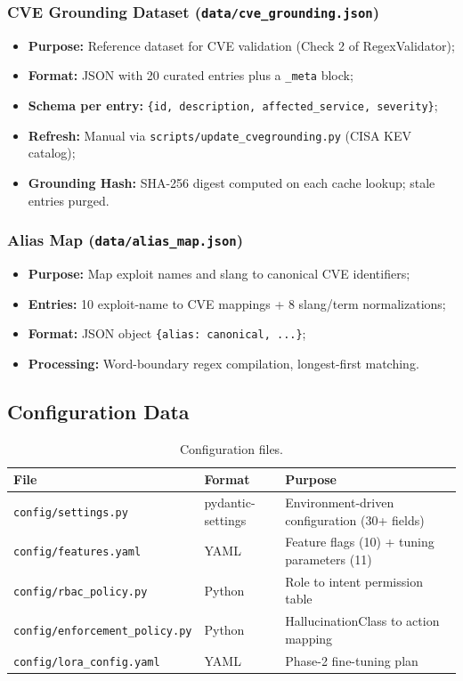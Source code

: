 ﻿\documentclass[10pt,journal,onecolumn]{IEEEtran}
\begin{document}
\subsubsection{CVE Grounding Dataset (\texttt{data/cve\_grounding.json})}
\begin{itemize}
\item \textbf{Purpose:} Reference dataset for CVE validation (Check 2 of RegexValidator);
\item \textbf{Format:} JSON with 20 curated entries plus a \texttt{\_meta} block;
\item \textbf{Schema per entry:} \texttt{\{id, description, affected\_service, severity\}};
\item \textbf{Refresh:} Manual via \texttt{scripts/update\_cve\allowbreak{}grounding.py} (CISA KEV catalog);
\item \textbf{Grounding Hash:} SHA-256 digest computed on each cache lookup; stale entries purged.
\end{itemize}

\subsubsection{Alias Map (\texttt{data/alias\_map.json})}
\begin{itemize}
\item \textbf{Purpose:} Map exploit names and slang to canonical CVE identifiers;
\item \textbf{Entries:} 10 exploit-name to CVE mappings + 8 slang/term normalizations;
\item \textbf{Format:} JSON object \texttt{\{alias: canonical, ...\}};
\item \textbf{Processing:} Word-boundary regex compilation, longest-first matching.
\end{itemize}

\subsection{Configuration Data}
\begin{table}[t]
\caption{Configuration files.}
\label{tab:config}
\begin{tabularx}{\textwidth}{>{\ttfamily}l l X}
\toprule
\textbf{File} & \textbf{Format} & \textbf{Purpose}\\
\midrule
\texttt{config/settings.py} & pydantic-settings & Environment-driven configuration (30+ fields)\\
\texttt{config/features.yaml} & YAML & Feature flags (10) + tuning parameters (11)\\
\texttt{config/rbac\_policy.py} & Python & Role to intent permission table\\
\texttt{config/enforcement\_policy.py} & Python & HallucinationClass to action mapping\\
\texttt{config/lora\_config.yaml} & YAML & Phase-2 fine-tuning plan\\
\bottomrule
\end{tabularx}
\end{table}
\end{document}
